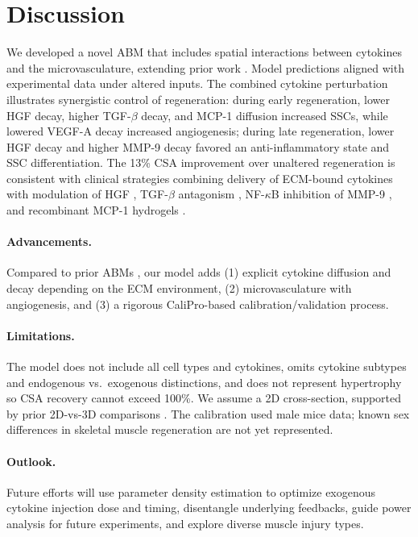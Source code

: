 \documentclass[11pt]{article}
\begin{document}
\section{Discussion}
We developed a novel ABM that includes spatial interactions between cytokines and the microvasculature, extending prior work \citep{r8,r15,r16}. Model predictions aligned with experimental data under altered inputs. The combined cytokine perturbation illustrates synergistic control of regeneration: during early regeneration, lower HGF decay, higher TGF-$\beta$ decay, and MCP-1 diffusion increased SSCs, while lowered VEGF-A decay increased angiogenesis; during late regeneration, lower HGF decay and higher MMP-9 decay favored an anti-inflammatory state and SSC differentiation. The 13\% CSA improvement over unaltered regeneration is consistent with clinical strategies combining delivery of ECM-bound cytokines \citep{r118,r120} with modulation of HGF \citep{r122}, TGF-$\beta$ antagonism \citep{r123}, NF-$\kappa$B inhibition of MMP-9 \citep{r124}, and recombinant MCP-1 hydrogels \citep{r125}.

\paragraph{Advancements.} Compared to prior ABMs \citep{r8,r15,r16,r17,r18}, our model adds (1) explicit cytokine diffusion and decay depending on the ECM environment, (2) microvasculature with angiogenesis, and (3) a rigorous CaliPro-based calibration/validation process.

\paragraph{Limitations.} The model does not include all cell types and cytokines, omits cytokine subtypes and endogenous vs.\ exogenous distinctions, and does not represent hypertrophy so CSA recovery cannot exceed 100\%. We assume a 2D cross-section, supported by prior 2D-vs-3D comparisons \citep{r126,r127}. The calibration used male mice data; known sex differences in skeletal muscle regeneration \citep{r128,r129,r130,r131} are not yet represented.

\paragraph{Outlook.} Future efforts will use parameter density estimation to optimize exogenous cytokine injection dose and timing, disentangle underlying feedbacks, guide power analysis for future experiments, and explore diverse muscle injury types.



\end{document}
